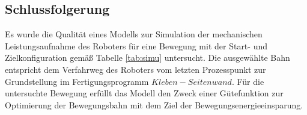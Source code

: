 \subsection*{Schlussfolgerung}
Es wurde die Qualität eines Modells zur Simulation der mechanischen Leistungsaufnahme des Roboters für eine Bewegung mit der Start- und Zielkonfiguration gemäß Tabelle \ref{tab:simu} untersucht. Die ausgewählte Bahn entspricht dem Verfahrweg des Roboters vom letzten Prozesspunkt zur Grundstellung im Fertigungsprogramm $Kleben-Seitenwand$. Für die untersuchte Bewegung erfüllt das Modell den Zweck einer Gütefunktion zur Optimierung der Bewegungsbahn mit dem Ziel der Bewegungsenergieeinsparung. 
%